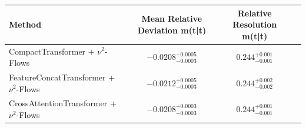     \begin{tabular}{lccc}
        \toprule
        Method & Mean Relative Deviation m(t\bar{t}) & Relative Resolution m(t\bar{t}) \\
        \midrule
        CompactTransformer + $\nu^2$-Flows & $-0.0208_{-0.0003}^{+0.0005}$ & $0.244_{-0.001}^{+0.001}$ \\
        FeatureConcatTransformer + $\nu^2$-Flows & $-0.0212_{-0.0003}^{+0.0005}$ & $0.244_{-0.002}^{+0.002}$ \\
        CrossAttentionTransformer + $\nu^2$-Flows & $-0.0208_{-0.0003}^{+0.0003}$ & $0.244_{-0.001}^{+0.001}$ \\
        \bottomrule
    \end{tabular}